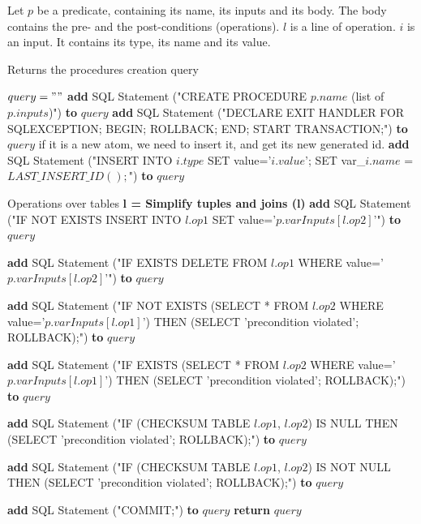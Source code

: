 \documentclass[oneside]{book}
\begin{document}
Let $p$ be a predicate, containing its name, its inputs and its body. The body contains the pre- and the post-conditions (operations). $l$ is a line of operation. $i$ is an input. It contains its type, its name and its value.\\
\begin{algorithm}
\caption{Returns the procedures creation query}
\label{array-sum3}
\begin{algorithmic}[1]
	\State $query = ""$
	\State \textbf{add} SQL Statement ("CREATE PROCEDURE $p.name$ (list of $p.inputs$)") \textbf{to} $query$
	\State \textbf{add} SQL Statement ("DECLARE EXIT HANDLER FOR SQLEXCEPTION; BEGIN; ROLLBACK; END; START TRANSACTION;") \textbf{to} $query$
		 \Comment if it is a new atom, we need to insert it, and get its new generated id.
			 \State \textbf{add} SQL Statement ("INSERT INTO $i.type$ SET value='$i.value$'; SET var\_$i.name$ = $LAST\_INSERT\_ID();$") \textbf{to} $query$
			\EndIf
		\EndFor
		
		 \Comment Operations over tables
			\State \textbf{l = Simplify tuples and joins (l)}
			 \State \textbf{add} SQL Statement ("IF NOT EXISTS INSERT INTO $l.op1$ SET value='$p.varInputs[l.op2]$'") \textbf{to} $query$
			
			 \State \textbf{add} SQL Statement ("IF EXISTS DELETE FROM $l.op1$ WHERE value='$p.varInputs[l.op2]$'") \textbf{to} $query$
			
			 \State \textbf{add} SQL Statement ("IF NOT EXISTS (SELECT * FROM $l.op2$ WHERE value='$p.varInputs[l.op1]$') THEN (SELECT 'precondition violated'; ROLLBACK);") \textbf{to} $query$
			
			 \State \textbf{add} SQL Statement ("IF EXISTS (SELECT * FROM $l.op2$ WHERE value='$p.varInputs[l.op1]$') THEN (SELECT 'precondition violated'; ROLLBACK);") \textbf{to} $query$
			
			 \State \textbf{add} SQL Statement ("IF (CHECKSUM TABLE $l.op1$, $l.op2$) IS NULL THEN (SELECT 'precondition violated'; ROLLBACK);") \textbf{to} $query$
			
			 \State \textbf{add} SQL Statement ("IF (CHECKSUM TABLE $l.op1$, $l.op2$) IS NOT NULL THEN (SELECT 'precondition violated'; ROLLBACK);") \textbf{to} $query$
			
			\EndIf
		\EndFor

	\State \textbf{add} SQL Statement ("COMMIT;") \textbf{to} $query$
	\EndFor
	\State \textbf{return} $query$
\EndFunction
\end{algorithmic}
\end{algorithm}
\end{document}
